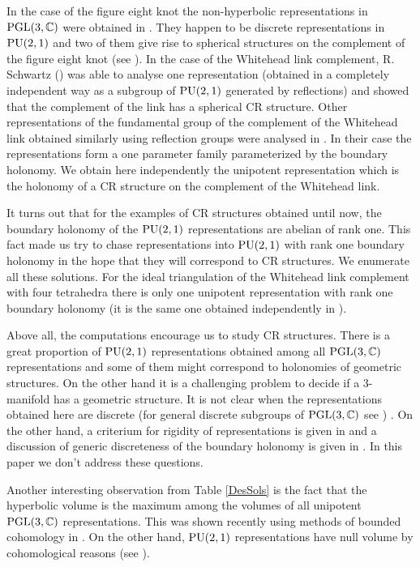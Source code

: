 In the case of the figure eight knot the non-hyperbolic representations in $\textrm{PGL}(3,\mathbb{C})$ were  obtained in \cite{falbeleight}.  They happen to be discrete representations in $\textrm{\textrm{PU}}(2,1)$ and two of them give rise to spherical structures on the complement of the figure eight knot (see \cite{DF,FW}).  In the case of the Whitehead link complement, R. Schwartz (\cite{Schwartz}) was able to analyse one  representation (obtained in a completely independent way as a subgroup of $\textrm{\textrm{PU}}(2,1)$ generated by reflections) and showed that the complement of the link has a spherical CR structure.  Other representations of the fundamental group of the complement of the Whitehead link obtained similarly using reflection groups were analysed in \cite{PW}.  In their case the representations form a one parameter family parameterized by the boundary holonomy. We obtain here independently the unipotent representation which is  the holonomy of a CR structure on the complement of the Whitehead link.

It turns out that for the examples of CR structures obtained until now, the boundary holonomy of the $\textrm{PU}(2,1)$ representations are abelian of rank one.  This fact made us  try
to chase  representations into $\textrm{PU}(2,1)$ with rank one boundary holonomy in the hope that they will correspond to CR structures.  We enumerate all these solutions.
  For the ideal triangulation of the Whitehead link complement with four tetrahedra there is only one unipotent
representation with rank one  boundary holonomy (it is the same one obtained independently in \cite{PW}).

Above all,  the computations encourage us to study CR structures.  There is a great proportion of $\textrm{PU}(2,1)$ representations obtained among all $\textrm{PGL}(3,\mathbb{C})$ representations
and some of them might correspond to holonomies of geometric structures.
On the other hand it is a challenging problem to decide if a 3-manifold has a geometric structure.  It is not clear when the representations obtained
here are discrete (for general discrete subgroups of $\textrm{PGL}(3,\mathbb{C})$ see \cite{CNS}) .  On the other hand, a criterium for
 rigidity of representations is given in \cite{BFGKR} and a discussion of generic discreteness of  the boundary holonomy is given in \cite{G}.  In this paper we don't address these questions.

Another interesting observation from  Table \ref{DesSols} is the fact that the hyperbolic volume is the maximum among the volumes of all unipotent $\textrm{PGL}(3,\mathbb{C})$ representations.  This was shown recently using methods of bounded cohomology in \cite{BBI}.   On the other hand, $\textrm{PU}(2,1)$ representations have null volume
by cohomological reasons (see \cite{FWang}).

